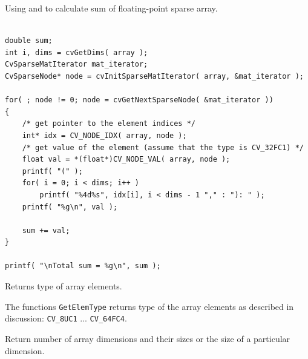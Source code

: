 Using  and  to calculate sum of floating-point sparse array.

\begin{lstlisting}

double sum;
int i, dims = cvGetDims( array );
CvSparseMatIterator mat_iterator;
CvSparseNode* node = cvInitSparseMatIterator( array, &mat_iterator );

for( ; node != 0; node = cvGetNextSparseNode( &mat_iterator ))
{
    /* get pointer to the element indices */
    int* idx = CV_NODE_IDX( array, node );
    /* get value of the element (assume that the type is CV_32FC1) */
    float val = *(float*)CV_NODE_VAL( array, node );
    printf( "(" );
    for( i = 0; i < dims; i++ )
        printf( "%4d%s", idx[i], i < dims - 1 "," : "): " );
    printf( "%g\n", val );

    sum += val;
}

printf( "\nTotal sum = %g\n", sum );

\end{lstlisting}


\label{GetElemType}

Returns type of array elements.


\begin{description}
\end{description}


The functions \texttt{GetElemType} returns type of the array elements
as described in  discussion: \texttt{CV\_8UC1}
... \texttt{CV\_64FC4}.


\label{GetDims, GetDimSize}

Return number of array dimensions and their sizes or the size of a particular dimension.


\begin{description}
\end{description}


